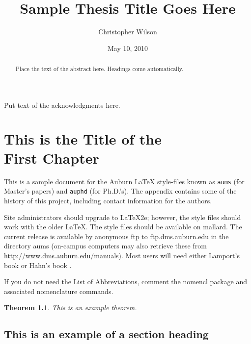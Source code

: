 \documentclass[12pt]{report}
\title{Sample Thesis Title Goes Here}
\author{Christopher Wilson}
\date{May 10, 2010} %
\newtheorem{theorem}{Theorem}[chapter]
\begin{document}
\begin{romanpages}      %

\TitlePage 

\begin{abstract} 
Place the text of the abstract here. Headings come automatically.
\end{abstract}

\begin{acknowledgments}
Put text of the acknowledgments here.
\end{acknowledgments}

\tableofcontents
\listoffigures
\listoftables

\printnomenclature[0.5in] %
\end{romanpages}        %


\normalem       %


\chapter{This is the Title of the\\ First Chapter}  %

This is a sample document for the Auburn  \LaTeX{} style-files known
as {\tt aums} (for Master's papers) and {\tt auphd} (for Ph.D.'s).
The appendix contains some of the history of this project, including
contact information for the authors. 

Site administrators should upgrade to \LaTeX2e; however, the style files
should work with the older \LaTeX.  The style files should be available
on mallard.  The current release is available by anonymous ftp to
ftp.dms.auburn.edu in the directory aums (on-campus computers may
also retrieve these from \url{http://www.dms.auburn.edu/manuals}).
Most users will need either Lamport's book \cite{lamport} or Hahn's book
\cite{hahn}.

If you do not need the List of Abbreviations, comment the nomencl package and associated nomenclature commands. 
\begin{theorem} This is an example theorem.
\end{theorem}

\section{This is an example of a section heading}
\end{document}
